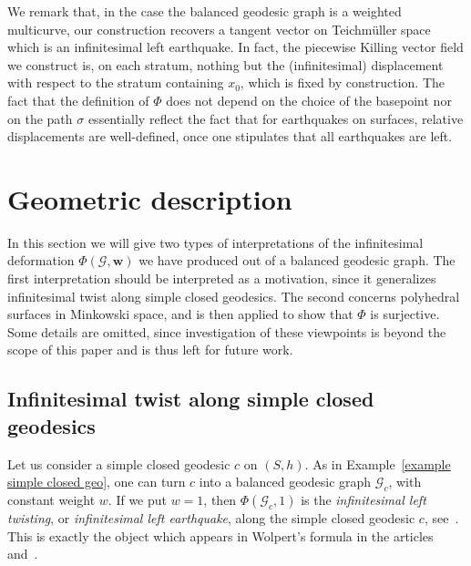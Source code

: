 \begin{rema}
We remark that, in the case the balanced geodesic graph is a weighted multicurve, our construction recovers a tangent vector on Teichm\"uller space which is an infinitesimal left earthquake. In fact, the piecewise Killing vector field we construct is, on each stratum, nothing but the (infinitesimal) displacement with respect to the stratum containing $x_0$, which is fixed by construction. The fact that the definition of $\Phi$ does not depend on the choice of the basepoint nor on the path $\sigma$ essentially reflect the fact that for earthquakes on surfaces, relative displacements are well-defined, once one stipulates that all earthquakes are left.
\end{rema}

\section{Geometric description}

In this section we will give two types of interpretations of the infinitesimal deformation $\Phi(\mathcal{G},\mathbf w)$ we have produced out of a balanced geodesic graph. The first interpretation should be interpreted as a motivation, since it generalizes infinitesimal twist along simple closed geodesics. The second concerns polyhedral surfaces in Minkowski space, and is then applied to show that $\Phi$ is surjective. Some details are omitted, since investigation of these viewpoints is beyond the scope of this paper and is thus left for future work.

\subsection{Infinitesimal twist along simple closed geodesics}
Let us consider a simple closed geodesic $c$ on $(S,h)$. As in Example~\ref{example simple closed geo}, one can turn $c$ into a balanced geodesic graph $\mathcal{G}_c$, with constant weight $w$. If we put $w=1$, then $\Phi(\mathcal{G}_c,1)$ is the \emph{infinitesimal left twisting}, or \emph{infinitesimal left earthquake}, along the simple closed geodesic $c$, see~\cite[Proposition~B.3]{bonschlfixed}. This is exactly the object which appears in Wolpert's formula in the articles~\cite{wolpertformula} and~\cite{wolpertelementary}.




